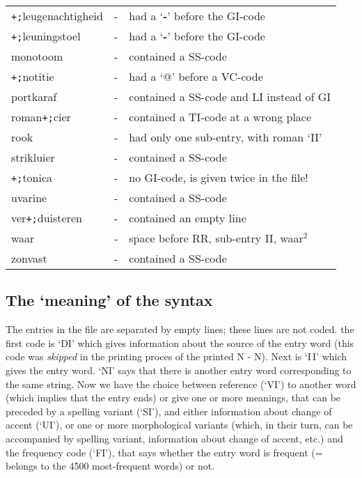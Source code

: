 \begin{table}[htb]
\begin{tabular}{lcl}
{\tt +;}leugenachtigheid &-& had a `{\bf -}' before the GI-code \\
{\tt +;}leuningstoel     &-& had a `{\bf -}' before the GI-code \\

monotoom           &-& contained a SS-code \\

{\tt +;}notitie          &-& had a `@' before a VC-code \\

portkaraf          &-& contained a SS-code and LI instead of GI \\

roman{\tt +;}cier        &-& contained a TI-code at a wrong place \\
rook               &-& had only one sub-entry, with roman `II' \\

strikluier         &-& contained a SS-code \\

{\tt +;}tonica           &-& no GI-code, is given twice in the file! \\

uvarine            &-& contained a SS-code \\

ver{\tt +;}duisteren     &-& contained an empty line \\

waar               &-& space before RR, sub-entry II, waar$^{2}$ \\

zonvast            &-& contained a SS-code \\
\end{tabular}
\end{table}

\subsection{The `meaning' of the syntax}
The entries in the file are separated by empty lines; these lines are not coded.
the first code is `DI' which gives information about the source of the entry 
word (this code was {\em skipped} in the printing proces of the printed 
N - N). Next is `I\,I' which gives the entry word. `NI' says that there is another
entry word corresponding to the same string. Now we have the choice between 
reference (`VI') to another word (which implies that the entry ends) or give 
one or more meanings, that can be preceded by a spelling variant (`SI'), 
and either information about change of accent (`UI'), or one or more 
morphological variants (which, in their turn, can be accompanied by spelling 
variant,
information about change of accent, etc.) and the frequency code (`FI'), that
says whether the entry word is frequent (= belongs to the 4500 most-frequent 
words) or not.

